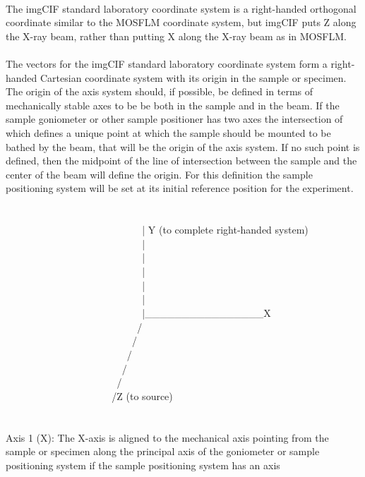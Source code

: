 \documentclass[11pt]{article}
\begin{document}
{~~\\
The imgCIF standard laboratory coordinate system is a right-handed
orthogonal coordinate similar to the MOSFLM coordinate system,
but imgCIF puts Z along the X-ray beam, rather than putting X along the
X-ray beam as in MOSFLM.\\
~~\\
The vectors for the imgCIF standard laboratory coordinate system
form a right-handed Cartesian coordinate system with its origin
in the sample or specimen.  The origin of the axis system should,
if possible, be defined in terms of mechanically stable axes to be
be both in the sample and in the beam.  If the sample goniometer or other
sample positioner has two axes the intersection of which defines a
unique point at which the sample should be mounted to be bathed
by the beam, that will be the origin of the axis system.  If no such
point is defined, then the midpoint of the line of intersection
between the sample and the center of the beam will define the origin.
For this definition the sample positioning system will be set at
its initial reference position for the experiment.\\
~~\\
~~\\
\verb.                           .| Y (to complete right-handed system)\\
\verb.                           .|\\
\verb.                           .|\\
\verb.                           .|\\
\verb.                           .|\\
\verb.                           .|\\
\verb.                           .|\_\_\_\_\_\_\_\_\_\_\_\_\_\_\_\_X\\
\verb.                          ./\\
\verb.                         ./\\
\verb.                        ./\\
\verb.                       ./\\
\verb.                      ./\\
\verb.                     ./Z (to source)\\
~~\\
~~\\
Axis 1 (X): The X-axis is aligned to the mechanical axis pointing from
the sample or specimen along the  principal axis of the goniometer or
sample positioning system if the sample positioning system has an axis
}
\end{document}
